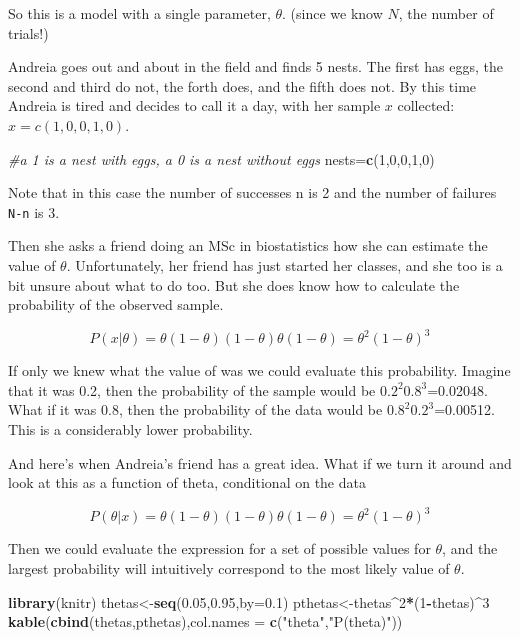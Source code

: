 \documentclass[
]{book}
\newenvironment{Shaded}{\begin{snugshade}}{\end{snugshade}}
\newcommand{\CommentTok}[1]{\textcolor[rgb]{0.56,0.35,0.01}{\textit{#1}}}
\newcommand{\DataTypeTok}[1]{\textcolor[rgb]{0.13,0.29,0.53}{#1}}
\newcommand{\DecValTok}[1]{\textcolor[rgb]{0.00,0.00,0.81}{#1}}
\newcommand{\FloatTok}[1]{\textcolor[rgb]{0.00,0.00,0.81}{#1}}
\newcommand{\KeywordTok}[1]{\textcolor[rgb]{0.13,0.29,0.53}{\textbf{#1}}}
\newcommand{\NormalTok}[1]{#1}
\newcommand{\OperatorTok}[1]{\textcolor[rgb]{0.81,0.36,0.00}{\textbf{#1}}}
\newcommand{\StringTok}[1]{\textcolor[rgb]{0.31,0.60,0.02}{#1}}
\begin{document}
So this is a model with a single parameter, \(\theta\). (since we know \(N\), the number of trials!)

Andreia goes out and about in the field and finds 5 nests. The first has eggs, the second and third do not, the forth does, and the fifth does not. By this time Andreia is tired and decides to call it a day, with her sample \(x\) collected: \(x=c(1,0,0,1,0)\).

\begin{Shaded}
\begin{Highlighting}[]
\CommentTok{#a 1 is a nest with eggs, a 0 is a nest without eggs}
\NormalTok{nests=}\KeywordTok{c}\NormalTok{(}\DecValTok{1}\NormalTok{,}\DecValTok{0}\NormalTok{,}\DecValTok{0}\NormalTok{,}\DecValTok{1}\NormalTok{,}\DecValTok{0}\NormalTok{)}
\end{Highlighting}
\end{Shaded}

Note that in this case the number of successes n is 2 and the number of failures \texttt{N-n} is 3.

Then she asks a friend doing an MSc in biostatistics how she can estimate the value of \(\theta\). Unfortunately, her friend has just started her classes, and she too is a bit unsure about what to do too. But she does know how to calculate the probability of the observed sample.

\[P(x|\theta)=\theta (1-\theta) (1-\theta) \theta (1-\theta)=\theta^2 (1-\theta)^3\]

If only we knew what the value of \theta was we could evaluate this probability. Imagine that it was 0.2, then the probability of the sample would be \(0.2^2 0.8^3\)=0.02048. What if it was 0.8, then the probability of the data would be \(0.8^2 0.2^3\)=0.00512. This is a considerably lower probability.

And here's when Andreia's friend has a great idea. What if we turn it around and look at this as a function of theta, conditional on the data

\[P(\theta|x)=\theta (1-\theta) (1-\theta) \theta (1-\theta)=\theta^2 (1-\theta)^3\]

Then we could evaluate the expression for a set of possible values for \(\theta\), and the largest probability will intuitively correspond to the most likely value of \(\theta\).

\begin{Shaded}
\begin{Highlighting}[]
\KeywordTok{library}\NormalTok{(knitr)}
\NormalTok{thetas<-}\KeywordTok{seq}\NormalTok{(}\FloatTok{0.05}\NormalTok{,}\FloatTok{0.95}\NormalTok{,}\DataTypeTok{by=}\FloatTok{0.1}\NormalTok{)}
\NormalTok{pthetas<-thetas}\OperatorTok{^}\DecValTok{2}\OperatorTok{*}\NormalTok{(}\DecValTok{1}\OperatorTok{-}\NormalTok{thetas)}\OperatorTok{^}\DecValTok{3}
\KeywordTok{kable}\NormalTok{(}\KeywordTok{cbind}\NormalTok{(thetas,pthetas),}\DataTypeTok{col.names =} \KeywordTok{c}\NormalTok{(}\StringTok{"theta"}\NormalTok{,}\StringTok{"P(theta)"}\NormalTok{))}
\end{Highlighting}
\end{Shaded}
\end{document}
